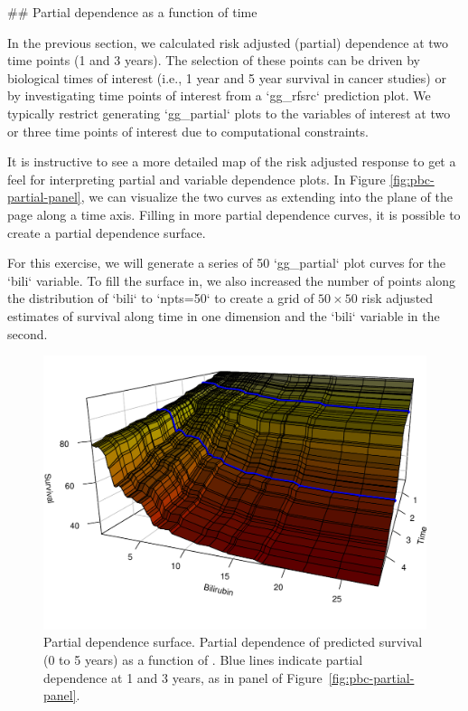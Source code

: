\documentclass[article]{jss}
\begin{document}
## Partial dependence as a function of time

In the previous section, we calculated risk adjusted (partial) dependence at two time points (1 and 3 years). The selection of these points can be driven by biological times of interest (i.e., 1 year and 5 year survival in cancer studies) or by investigating time points of interest from a `gg_rfsrc` prediction plot. We typically restrict generating `gg_partial` plots to the variables of interest at two or three time points of interest due to computational constraints.

It is instructive to see a more detailed map of the risk adjusted response to get a feel for interpreting partial and variable dependence plots. In Figure \ref{fig:pbc-partial-panel}, we can visualize the two curves as extending into the plane of the page along a time axis. Filling in more partial dependence curves, it is possible to create a partial dependence surface.

For this exercise, we will generate a series of 50 `gg_partial` plot curves for the `bili` variable. To fill the surface in, we also increased the number of points along the distribution of `bili` to `npts=50` to create a grid of $50 \times 50$ risk adjusted estimates of survival along time in one dimension and the `bili` variable in the second.


\begin{Schunk}
\begin{figure}[!htb]

{\centering \includegraphics{fig-rfs/rfs-timeSurface3d-1} 

}

\caption{Partial dependence surface. Partial dependence of predicted survival (0 to 5 years) as a function of . Blue lines indicate partial dependence at 1 and 3 years, as in  panel of Figure~\ref{fig:pbc-partial-panel}.}\label{fig:timeSurface3d}
\end{figure}
\end{Schunk}
\end{document}
